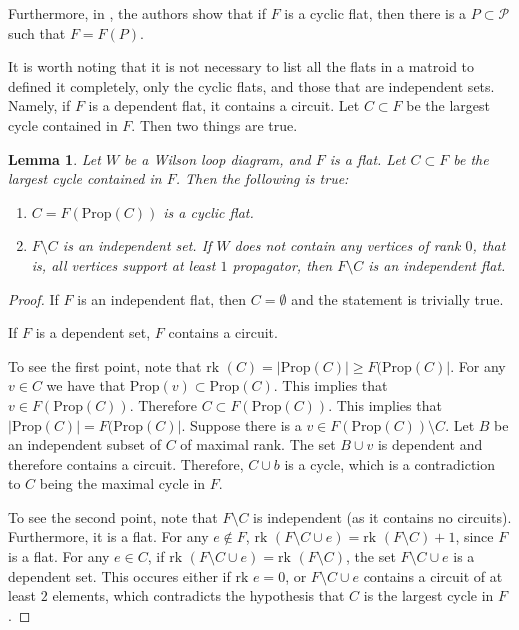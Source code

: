 \documentclass[11pt]{article}
\newcommand{\rk}{\textrm{rk }}
\newcommand{\cP}{\mathcal{P}}
\newcommand{\Prop}{\textrm{Prop}}
\newtheorem{lem}[thm]{Lemma}
\theoremstyle{remark}
\theoremstyle{definition}
\begin{document}
Furthermore, in \cite{wilsonloops}, the authors show that if $F$ is a cyclic flat, then there is a $P \subset \cP$ such that $F = F(P)$.

It is worth noting that it is not necessary to list all the flats in a matroid to defined it completely, only the cyclic flats, and those that are independent sets. Namely, if $F$ is a dependent flat, it contains a circuit. Let $C \subset F$ be the largest cycle contained in $F$. Then two things are true.

\begin{lem} Let $W$ be a Wilson loop diagram, and $F$ is a flat. Let $C \subset F$ be the largest cycle contained in $F$. Then the following is true:
\begin{enumerate}
\item $C = F(\Prop (C))$ is a cyclic flat.
\item $F \setminus C$ is an independent set. If $W$ does not contain any vertices of rank $0$, that is, all vertices support at least $1$ propagator, then $F \setminus C$ is an independent flat.
\end{enumerate}
\end{lem}

\begin{proof}
If $F$ is an independent flat, then $C = \emptyset$ and the statement is trivially true.

If $F$ is a dependent set, $F$ contains a circuit.

To see the first point, note that $\rk(C) = |\Prop(C)| \geq F(\Prop (C)|$.  For any $v\in C$ we have that $\Prop(v) \subset \Prop(C)$. This implies that $v \in F(\Prop(C))$. Therefore $C \subset F(\Prop(C))$. This implies that $|\Prop(C)| = F(\Prop (C)|$. Suppose there is a $v \in  F(\Prop(C)) \setminus C$. Let $B$ be an independent subset of $C$ of maximal rank. The set $B \cup v$ is dependent and therefore contains a circuit. Therefore, $C \cup b$ is a cycle, which is a contradiction to $C$ being the maximal cycle in $F$.

To see the second point, note that $F \setminus C$ is independent (as it contains no circuits). Furthermore, it is a flat. For any $e \not \in F$, $\rk (F \setminus C \cup e) = \rk (F\setminus C) +1$, since $F$ is a flat. For any $e \in C$,  if $\rk (F \setminus C \cup e) = \rk (F\setminus C)$, the set $F \setminus C \cup e$ is a dependent set. This occures either if $\rk{e} = 0$, or $F\setminus C \cup e$ contains a circuit of at least $2$ elements, which contradicts the hypothesis that $C$ is the largest cycle in $F$.
\end{proof}
\end{document}
